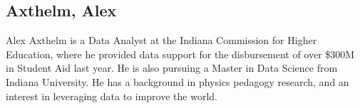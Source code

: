\subsection{Axthelm, Alex}

Alex Axthelm is a Data Analyst at the Indiana Commission for Higher
Education, where he provided data support for the disbursement of over
\$300M in Student Aid last year. He is also pursuing a Master in Data
Science from Indiana University. He has a background in physics
pedagogy research, and an interest in leveraging data to improve the
world.

